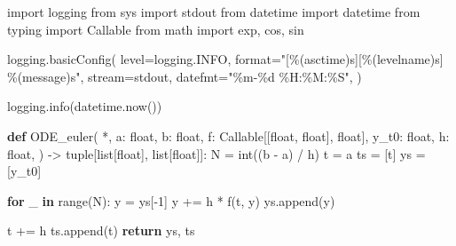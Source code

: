 \documentclass[
  letterpaper,
  DIV=11,
  numbers=noendperiod]{scrartcl}
\newenvironment{Shaded}{\begin{snugshade}}{\end{snugshade}}
\newcommand{\BuiltInTok}[1]{\textcolor[rgb]{0.00,0.23,0.31}{#1}}
\newcommand{\ControlFlowTok}[1]{\textcolor[rgb]{0.00,0.23,0.31}{\textbf{#1}}}
\newcommand{\DecValTok}[1]{\textcolor[rgb]{0.68,0.00,0.00}{#1}}
\newcommand{\ImportTok}[1]{\textcolor[rgb]{0.00,0.46,0.62}{#1}}
\newcommand{\KeywordTok}[1]{\textcolor[rgb]{0.00,0.23,0.31}{\textbf{#1}}}
\newcommand{\NormalTok}[1]{\textcolor[rgb]{0.00,0.23,0.31}{#1}}
\newcommand{\OperatorTok}[1]{\textcolor[rgb]{0.37,0.37,0.37}{#1}}
\newcommand{\SpecialCharTok}[1]{\textcolor[rgb]{0.37,0.37,0.37}{#1}}
\newcommand{\StringTok}[1]{\textcolor[rgb]{0.13,0.47,0.30}{#1}}
\begin{document}
\begin{Shaded}
\begin{Highlighting}[]
\ImportTok{import}\NormalTok{ logging}
\ImportTok{from}\NormalTok{ sys }\ImportTok{import}\NormalTok{ stdout}
\ImportTok{from}\NormalTok{ datetime }\ImportTok{import}\NormalTok{ datetime}
\ImportTok{from}\NormalTok{ typing }\ImportTok{import}\NormalTok{ Callable}
\ImportTok{from}\NormalTok{ math }\ImportTok{import}\NormalTok{ exp, cos, sin}

\NormalTok{logging.basicConfig(}
\NormalTok{    level}\OperatorTok{=}\NormalTok{logging.INFO,}
    \BuiltInTok{format}\OperatorTok{=}\StringTok{"[}\SpecialCharTok{\%(asctime)s}\StringTok{][}\SpecialCharTok{\%(levelname)s}\StringTok{] }\SpecialCharTok{\%(message)s}\StringTok{"}\NormalTok{,}
\NormalTok{    stream}\OperatorTok{=}\NormalTok{stdout,}
\NormalTok{    datefmt}\OperatorTok{=}\StringTok{"\%m{-}}\SpecialCharTok{\%d}\StringTok{ \%H:\%M:\%S"}\NormalTok{,}
\NormalTok{)}

\NormalTok{logging.info(datetime.now())}

\KeywordTok{def}\NormalTok{ ODE\_euler(}
    \OperatorTok{*}\NormalTok{,}
\NormalTok{    a: }\BuiltInTok{float}\NormalTok{,}
\NormalTok{    b: }\BuiltInTok{float}\NormalTok{,}
\NormalTok{    f: Callable[[}\BuiltInTok{float}\NormalTok{, }\BuiltInTok{float}\NormalTok{], }\BuiltInTok{float}\NormalTok{],}
\NormalTok{    y\_t0: }\BuiltInTok{float}\NormalTok{,}
\NormalTok{    h: }\BuiltInTok{float}\NormalTok{,}
\NormalTok{) }\OperatorTok{{-}\textgreater{}} \BuiltInTok{tuple}\NormalTok{[}\BuiltInTok{list}\NormalTok{[}\BuiltInTok{float}\NormalTok{], }\BuiltInTok{list}\NormalTok{[}\BuiltInTok{float}\NormalTok{]]:}
\NormalTok{    N }\OperatorTok{=} \BuiltInTok{int}\NormalTok{((b }\OperatorTok{{-}}\NormalTok{ a) }\OperatorTok{/}\NormalTok{ h) }
\NormalTok{    t }\OperatorTok{=}\NormalTok{ a}
\NormalTok{    ts }\OperatorTok{=}\NormalTok{ [t]}
\NormalTok{    ys }\OperatorTok{=}\NormalTok{ [y\_t0]}

    \ControlFlowTok{for}\NormalTok{ \_ }\KeywordTok{in} \BuiltInTok{range}\NormalTok{(N):}
\NormalTok{        y }\OperatorTok{=}\NormalTok{ ys[}\OperatorTok{{-}}\DecValTok{1}\NormalTok{]}
\NormalTok{        y }\OperatorTok{+=}\NormalTok{ h }\OperatorTok{*}\NormalTok{ f(t, y)}
\NormalTok{        ys.append(y)}

\NormalTok{        t }\OperatorTok{+=}\NormalTok{ h}
\NormalTok{        ts.append(t)}
    \ControlFlowTok{return}\NormalTok{ ys, ts}
\end{Highlighting}
\end{Shaded}
\end{document}
